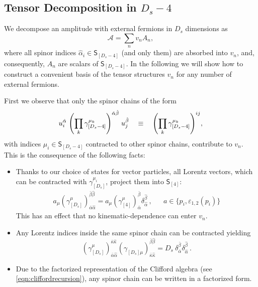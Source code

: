 \subsection{Tensor Decomposition in $D_s-4$}
\label{sec:HelAmplHV}

We decompose an amplitude with external fermions in $D_s$ dimensions as
\begin{equation} \label{eq:tensorDecomposition}
  \mathcal{A} = \sum_n v_n A_n,
\end{equation}
where all spinor indices $\hat{\alpha}_i \in \mathsf{S}_{[D_s-4]}$ (and only them) are absorbed into $v_n$,
and, consequently, $A_n$ are scalars of $\mathsf{S}_{[D_s-4]}$.
In the following we will show how to construct a convenient basis of the tensor structures $v_n$ 
for any number of external fermions.

First we observe that only the spinor chains of the form
\begin{equation} \label{eq:generic_dsm_4_schain}
  u^{\hat{\alpha}}_i \; \qty( \prod_k \gamma^{\mu_k}_{[D_s -4 ]} )^{\hat{\alpha}\hat{\beta}} \; u^{\hat{\beta}}_j \quad\equiv\quad 
  \qty( \prod_k \gamma^{\mu_k}_{[D_s -4 ]} )^{i j},
\end{equation}
with indices $\mu_i \in \mathsf{S}_{[D_s -4]}$ contracted to other spinor chains, contribute to $v_n$.
This is the consequence of the following facts:
\begin{itemize}
  \item Thanks to our choice of states for vector particles, all Lorentz vectors, which can be contracted with $\gamma^{\mu_i}_{[D_s]}$,
    project them into $\mathsf{S}_{[4]}$:
    \begin{align} \label{eq:trivialTens1}
      a_{\mu}
      \left( \gamma_{[D_s]}^\mu \right)_{\bar{\alpha}\hat{\alpha}}^{\bar{\beta}\hat{\beta}} =
      a_{\mu}\left(\gamma_{[4]}^\mu \right)_{\bar{\alpha}}^{\bar{\beta}} \delta_{\hat{\alpha}}^{\hat{\beta}}\,,
      &&
      a \in \{p_i,\varepsilon_{1,2}(p_i)\}
    \end{align}
    This has an effect that no kinematic-dependence can enter $v_n$.
  \item Any Lorentz indices inside the same spinor chain can be contracted yielding  
    \begin{equation} \label{eq:trivialTens2}
      \left(\gamma_{[D_s]}^\mu\right)_{\bar{\alpha}\hat{\alpha}}^{\bar{\kappa}\hat{\kappa}}
      \left(\gamma_{[D_s]\mu}^{\phantom{\mu}}\right)_{\bar{\kappa}\hat{\kappa}}^{\bar{\beta}\hat{\beta}}
      =D_s~\delta_{\bar{\alpha}}^{\bar{\beta}}\delta_{\hat{\alpha}}^{\hat{\beta}}\,.
    \end{equation} 
  \item Due to the factorized representation of the Clifford algebra (see \cref{eqn:cliffordrecursion}), any spinor chain can be written in a factorized form.
\end{itemize}
